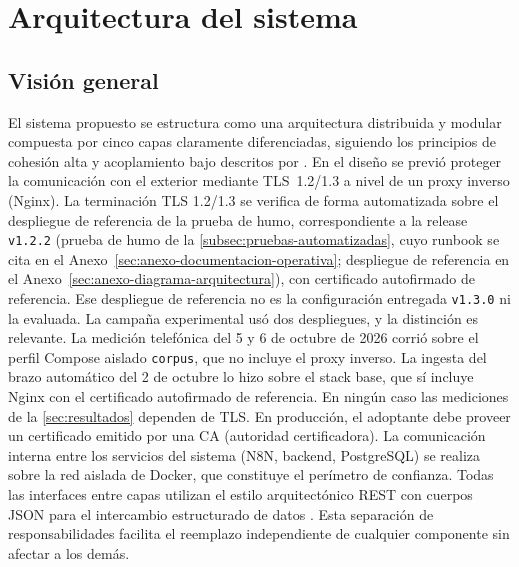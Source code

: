 \section{Arquitectura del sistema}\label{sec:arquitectura}

\subsection{Visión general}\label{subsec:vision-general}

El sistema propuesto se estructura como una arquitectura distribuida y modular compuesta por cinco capas claramente diferenciadas, siguiendo los principios de cohesión alta y acoplamiento bajo descritos por \textcite{Pressman2020_software_engineering}. En el diseño se previó proteger la comunicación con el exterior mediante TLS~1.2/1.3 a nivel de un proxy inverso (Nginx). La terminación TLS 1.2/1.3 se verifica de forma automatizada sobre el despliegue de referencia de la prueba de humo, correspondiente a la release \texttt{v1.2.2} (prueba de humo de la \autoref{subsec:pruebas-automatizadas}, cuyo runbook se cita en el Anexo~\ref{sec:anexo-documentacion-operativa}; despliegue de referencia en el Anexo~\ref{sec:anexo-diagrama-arquitectura}), con certificado autofirmado de referencia. Ese despliegue de referencia no es la configuración entregada \texttt{v1.3.0} ni la evaluada. La campaña experimental usó dos despliegues, y la distinción es relevante. La medición telefónica del 5 y 6 de octubre de 2026 corrió sobre el perfil Compose aislado \texttt{corpus}, que no incluye el proxy inverso. La ingesta del brazo automático del 2 de octubre lo hizo sobre el stack base, que sí incluye Nginx con el certificado autofirmado de referencia. En ningún caso las mediciones de la \autoref{sec:resultados} dependen de TLS. En producción, el adoptante debe proveer un certificado emitido por una CA (autoridad certificadora). La comunicación interna entre los servicios del sistema (N8N, backend, PostgreSQL) se realiza sobre la red aislada de Docker, que constituye el perímetro de confianza. Todas las interfaces entre capas utilizan el estilo arquitectónico REST con cuerpos JSON para el intercambio estructurado de datos \parencite{Fielding2002_rest}. Esta separación de responsabilidades facilita el reemplazo independiente de cualquier componente sin afectar a los demás.

